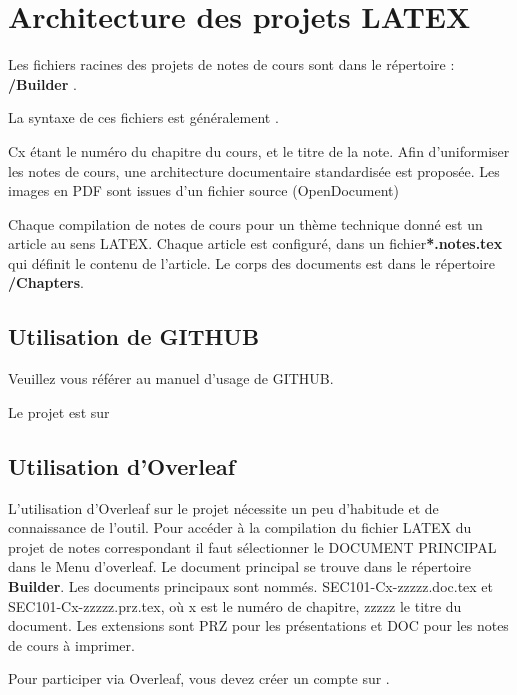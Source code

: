 \section{Architecture des projets LATEX}

\begin{frame}
	

Les fichiers racines des projets de notes de cours sont dans le répertoire : \textbf{/Builder} . 

La syntaxe de ces fichiers est généralement . 

Cx étant le numéro du chapitre du cours, et  le titre de la note.
Afin d'uniformiser les notes de cours, une architecture documentaire standardisée est proposée. 
Les images en PDF sont issues d'un fichier source (OpenDocument)

Chaque compilation de notes de cours pour un thème  technique donné est un article au sens LATEX. Chaque article est configuré, dans un fichier\textbf{*.notes.tex} qui définit le contenu de l'article. Le corps des documents est dans le répertoire \textbf{/Chapters}. 
\end{frame}

\subsection{Utilisation de GITHUB}

Veuillez vous référer au manuel d'usage de GITHUB. 

Le projet est sur  


\subsection{Utilisation d'Overleaf}

L'utilisation d'Overleaf sur le projet nécessite un peu d'habitude et de connaissance de l'outil. Pour accéder à la compilation du fichier LATEX du projet de notes correspondant il faut sélectionner le DOCUMENT PRINCIPAL dans le Menu d'overleaf. Le document principal se trouve dans le répertoire \textbf{Builder}. Les documents principaux sont nommés. SEC101-Cx-zzzzz.doc.tex et SEC101-Cx-zzzzz.prz.tex, où x est  le numéro de chapitre, zzzzz le titre du document. Les extensions sont PRZ pour les présentations et DOC pour les notes de cours à imprimer.

Pour participer via Overleaf, vous devez créer un compte sur .

